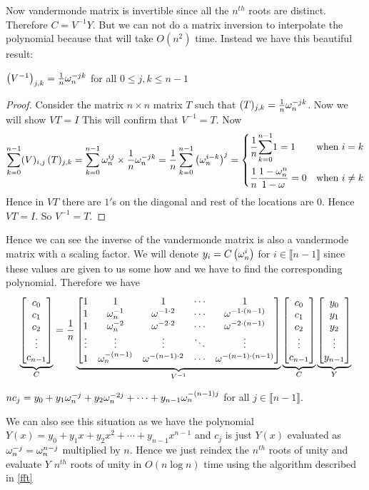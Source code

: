 Now vandermonde matrix is invertible since all the $n^{th}$ roots are distinct. Therefore $C=V^{-1}Y$. But we can not do a matrix inversion to interpolate the polynomial because that will take $O(n^2)$ time. Instead we have this beautiful result:
 \begin{lemma}{}{}
 	$\left(V^{-1}\right)_{j,k}=\frac1n\omega_n^{-jk}$ for all $0\leq j,k\leq n-1$
 \end{lemma}
\begin{proof}
	Consider the matrix $n\times n$ matrix $T$ such that $(T)_{j,k}=\frac1n\omega_n^{-jk}$. Now we will show $VT=I$ This will confirm that $V^{-1}=T$. Now $$\sum_{k=0}^{n-1} (V)_{i,j}\, (T)_{j,k}=\sum_{k=0}^{n-1} \omega^{ij}_n\times \frac1n\omega_n^{-jk}=\frac1n\sum_{k=0}^{n-1}\left(\omega^{i-k}_n\right)^j=\begin{cases}
		\dfrac1n\displaystyle{\sum\limits_{k=0}^{n-1}}1=1& \text{when $i=k$}\\[5mm] \dfrac1n \dfrac{1-\omega^n_n}{1-\omega} =0 & \text{when $i\neq k$}
	\end{cases} $$Hence in $VT$ there are $1'$s on the diagonal and rest of the locations are $0$. Hence $VT=I$. So $V^{-1}=T$.
\end{proof}
Hence we can see the inverse of the vandermonde matrix is also a vandermode matrix with a scaling factor. We will denote $y_i=C\left(\omega_n^{i}\right)$ for $i\in\llbracket n-1\rrbracket$ since these values are given to us some how and we have to find the corresponding polynomial. Therefore we have $$\underbrace{\left[\begin{matrix}c_0\\ c_1\\ c_2\\ \vdots \\ c_{n-1}\end{matrix}\right]}_{C}=\frac1n\underbrace{\left[\begin{matrix}1 & 1 & 1& \cdots & 1\\  1 & \omega^{-1}_n & \omega ^{-1\cdot 2}& \cdots & \omega^{-1\cdot (n-1)}\\ 1 & \omega^{-2}_n & \omega ^{-2\cdot 2}& \cdots & \omega^{-2\cdot (n-1)}\\ \vdots & \vdots & \vdots & \ddots & \vdots\\ 1 & \omega^{-(n-1)}_n & \omega ^{-(n-1)\cdot 2}& \cdots & \omega^{-(n-1)\cdot (n-1)}\end{matrix}\right]}_{V^{-1}}\underbrace{\left[\begin{matrix}c_0\\ c_1\\ c_2\\ \vdots \\ c_{n-1}\end{matrix}\right]}_{C}\underbrace{\left[\begin{matrix}y_0\\ y_1\\ y_2\\ \vdots\\ y_{n-1}\end{matrix}\right]}_{Y}$$
\begin{observation*}
	$nc_j=y_0+y_1\omega_n^{-j}+y_2\omega_n^{-2j}+\cdots+y_{n-1}\omega_n^{-(n-1)j}$ for all $j\in\llbracket n-1\rrbracket$.
\end{observation*}
We can also see this situation as we have the polynomial $Y(x)=y_0+y_1x+y_2x^2+\cdots +y_{n-1}x^{n-1}$ and $c_j$ is just $Y(x)$ evaluated as $\omega^{-j}_n=\omega_n^{n-j}$ multiplied by $n$. Hence we just reindex the $n^{th}$ roots of unity and evaluate $Y$ $n^{th}$ roots of unity in $O(n\log n)$ time using the algorithm described in \autoref{fft}